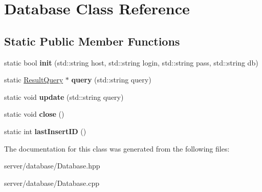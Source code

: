\hypertarget{class_database}{\section{Database Class Reference}
\label{class_database}
}
\subsection*{Static Public Member Functions}
\begin{DoxyCompactItemize}
\item 
\hypertarget{class_database_aa043c498891a850682b52e1176ff16c4}{static bool {\bfseries init} (std\-::string host, std\-::string login, std\-::string pass, std\-::string db)}\label{class_database_aa043c498891a850682b52e1176ff16c4}

\item 
\hypertarget{class_database_a701fff1c6ca3f5297009e4ebf49d30d4}{static \hyperlink{class_result_query}{Result\-Query} $\ast$ {\bfseries query} (std\-::string query)}\label{class_database_a701fff1c6ca3f5297009e4ebf49d30d4}

\item 
\hypertarget{class_database_a0c5ff26b3d0974eb8b804f68a045c63e}{static void {\bfseries update} (std\-::string query)}\label{class_database_a0c5ff26b3d0974eb8b804f68a045c63e}

\item 
\hypertarget{class_database_ab89cb07242f0ab1d4058974bf3e7cf19}{static void {\bfseries close} ()}\label{class_database_ab89cb07242f0ab1d4058974bf3e7cf19}

\item 
\hypertarget{class_database_aae35dd32bc2e9433d42d77290bdda962}{static int {\bfseries last\-Insert\-I\-D} ()}\label{class_database_aae35dd32bc2e9433d42d77290bdda962}

\end{DoxyCompactItemize}


The documentation for this class was generated from the following files\-:\begin{DoxyCompactItemize}
\item 
server/database/Database.\-hpp\item 
server/database/Database.\-cpp\end{DoxyCompactItemize}
